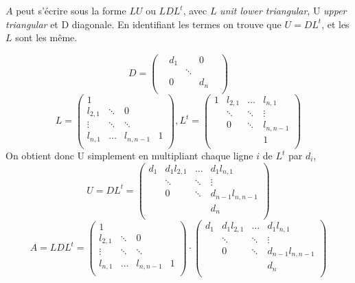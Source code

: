 \documentclass{article}
\begin{document}
\(A\) peut s'écrire sous la forme \(LU\) ou \(LDL^t\), avec \(L\) \textit{unit lower triangular}, U \textit{upper triangular} et D diagonale.
En identifiant les termes on trouve que \(U = DL^t\), et les \(L\) sont les même.

\[
	D = 
	\begin{pmatrix}
	&d_1	& 		& 0&	\\
	&		& \ddots& &		\\
	& 0	& 		& d_n & 	\\
	\end{pmatrix}
\]
\[	
	L = 
	\begin{pmatrix}
	1		& 	& 	&  	\\
	l_{2,1}	& \ddots&0& 	\\
	\vdots	& \ddots & \ddots&  \\
	l_{n,1}	& \dots  & l_{n,n-1} & 1 	\\
	\end{pmatrix}, 
	L^t = 
	\begin{pmatrix}
	1		& l_{2,1}& \dots	& l_{n,1} 	\\
			& \ddots&\ddots& \vdots	\\
			& 0 & \ddots& l_{n,n-1} \\
			&  && 1 	\\
	\end{pmatrix}
\]
On obtient donc U simplement en multipliant chaque ligne \(i\) de \(L^t\) par \(d_i\),
\[
	U = DL^t = 
	\begin{pmatrix}
	d_1		& d_1 l_{2,1}& \dots	& d_1 l_{n,1} 	\\
			& \ddots&\ddots& \vdots	\\
			& 0 & \ddots& d_{n-1} l_{n,n-1} \\
			&  && d_n 	\\
	\end{pmatrix}
\]
\[	
	A = LDL^t = 
	\begin{pmatrix}
	1		& 	& 	&  	\\
	l_{2,1}	& \ddots&0& 	\\
	\vdots	& \ddots & \ddots&  \\
	l_{n,1}	& \dots  & l_{n,n-1} & 1 	\\
	\end{pmatrix}\cdot
	\begin{pmatrix}
	d_1		& d_1 l_{2,1}& \dots	& d_1 l_{n,1} 	\\
			& \ddots&\ddots& \vdots	\\
			& 0 & \ddots& d_{n-1} l_{n,n-1} \\
			&  && d_n 	\\
	\end{pmatrix}
\]
\end{document}
